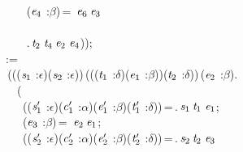 \,\,\,\,\,\,\,\,\,\,\,\,\,\,(\ensuremath{\HOLBoundVar{e}\sb{\mathrm{4}}} :\ensuremath{\beta})\,=\,\,\,\ensuremath{\HOLBoundVar{e}\sb{\mathrm{6}}}\,\ensuremath{\HOLBoundVar{e}\sb{\mathrm{3}}}\\
\,\,\,\,\,\,\,\,\,\,\,\,\\
\,\,\,\,\,\,\,\,\,\,\,\,\,\,.\,\ensuremath{\HOLBoundVar{t}\sb{\mathrm{2}}}\,\ensuremath{\HOLBoundVar{t}\sb{\mathrm{4}}}\,\ensuremath{\HOLBoundVar{e}\sb{\mathrm{2}}}\,\ensuremath{\HOLBoundVar{e}\sb{\mathrm{4}}}));\\
\,\,\,:=\\
\,\,\,\,(\HOLTokenLambda{}((\ensuremath{\HOLBoundVar{s}\sb{\mathrm{1}}} :\ensuremath{\epsilon})\HOLSymConst{,}(\ensuremath{\HOLBoundVar{s}\sb{\mathrm{2}}} :\ensuremath{\epsilon}))\,(((\ensuremath{\HOLBoundVar{t}\sb{\mathrm{1}}} :\ensuremath{\delta})\HOLSymConst{,}(\ensuremath{\HOLBoundVar{e}\sb{\mathrm{1}}} :\ensuremath{\beta}))\HOLSymConst{,}(\ensuremath{\HOLBoundVar{t}\sb{\mathrm{2}}} :\ensuremath{\delta}))\,(\ensuremath{\HOLBoundVar{e}\sb{\mathrm{2}}} :\ensuremath{\beta}).\\
\,\,\,\,\,\,\,\,\,(\\
\,\,\,\,\,\,\,\,\,\,\,\,((\ensuremath{\HOLBoundVar{s}\sb{\mathrm{1}}\sp{\prime{}}} :\ensuremath{\epsilon})\HOLSymConst{,}(\ensuremath{\HOLBoundVar{c}\sb{\mathrm{1}}\sp{\prime{}}} :\ensuremath{\alpha})\HOLSymConst{,}(\ensuremath{\HOLBoundVar{e}\sb{\mathrm{1}}\sp{\prime{}}} :\ensuremath{\beta})\HOLSymConst{,}(\ensuremath{\HOLBoundVar{t}\sb{\mathrm{1}}\sp{\prime{}}} :\ensuremath{\delta}))\,=\,.\,\ensuremath{\HOLBoundVar{s}\sb{\mathrm{1}}}\,\ensuremath{\HOLBoundVar{t}\sb{\mathrm{1}}}\,\ensuremath{\HOLBoundVar{e}\sb{\mathrm{1}}};\\
\,\,\,\,\,\,\,\,\,\,\,\,(\ensuremath{\HOLBoundVar{e}\sb{\mathrm{3}}} :\ensuremath{\beta})\,=\,\,\,\ensuremath{\HOLBoundVar{e}\sb{\mathrm{2}}}\,\ensuremath{\HOLBoundVar{e}\sb{\mathrm{1}}};\\
\,\,\,\,\,\,\,\,\,\,\,\,((\ensuremath{\HOLBoundVar{s}\sb{\mathrm{2}}\sp{\prime{}}} :\ensuremath{\epsilon})\HOLSymConst{,}(\ensuremath{\HOLBoundVar{c}\sb{\mathrm{2}}\sp{\prime{}}} :\ensuremath{\alpha})\HOLSymConst{,}(\ensuremath{\HOLBoundVar{e}\sb{\mathrm{2}}\sp{\prime{}}} :\ensuremath{\beta})\HOLSymConst{,}(\ensuremath{\HOLBoundVar{t}\sb{\mathrm{2}}\sp{\prime{}}} :\ensuremath{\delta}))\,=\,.\,\ensuremath{\HOLBoundVar{s}\sb{\mathrm{2}}}\,\ensuremath{\HOLBoundVar{t}\sb{\mathrm{2}}}\,\ensuremath{\HOLBoundVar{e}\sb{\mathrm{3}}}\\

